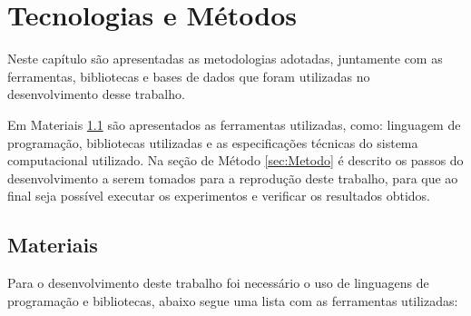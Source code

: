 \chapter{Tecnologias e Métodos}
Neste capítulo são apresentadas as metodologias adotadas, juntamente com as ferramentas, bibliotecas e bases de dados que foram utilizadas no desenvolvimento desse trabalho.

Em Materiais \ref{sec:Materiais} são apresentados as ferramentas utilizadas, como: linguagem de programação, bibliotecas utilizadas e as especificações técnicas do sistema computacional utilizado. Na seção de Método \ref{sec:Metodo} é descrito os passos do desenvolvimento a serem tomados para a reprodução deste trabalho, para que ao final seja possível executar os experimentos e verificar os resultados obtidos.


\section[Materiais]{Materiais}\label{sec:Materiais}

Para o desenvolvimento deste trabalho foi necessário o uso  de linguagens de programação e bibliotecas, abaixo segue uma lista com as ferramentas  utilizadas:

